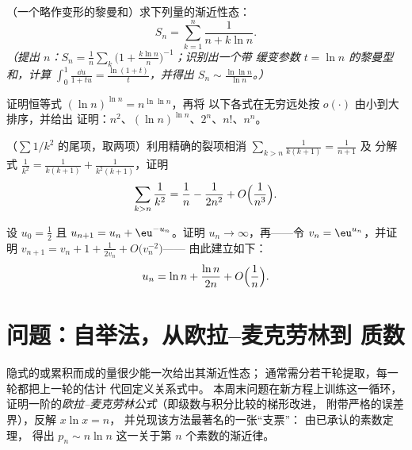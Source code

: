 \begin{exercise}[$\star\star\star$]\label{exo:b2:comparison:9}
（一个略作变形的黎曼和）求下列量的渐近性态：
\[
S_n = \sum_{k=1}^{n} \frac{1}{n + k\ln n} .
\]
\emph{（提出 $n$：$S_n = \frac1n\sum_k \bigl(1 +
\frac{k\ln n}{n}\bigr)^{-1}$；识别出一个带
缓变参数 $t = \ln n$ 的黎曼型和，计算 $\int_0^1
\frac{\dd u}{1 + tu} = \frac{\ln(1+t)}{t}$，并得出 $S_n \sim
\frac{\ln\ln n}{\ln n}$。）}
\end{exercise}

\begin{exercise}[$\star$]\label{exo:b2:comparison:10}
证明恒等式 $(\ln n)^{\ln n} = n^{\ln\ln n}$，再将
以下各式在无穷远处按 $o(\cdot)$ 由小到大排序，并给出
证明：$n^2$、$(\ln n)^{\ln n}$、$2^n$、$n!$、$n^n$。
\end{exercise}

\begin{exercise}[$\star\star$]\label{exo:b2:comparison:11}
（$\sum 1/k^2$ 的尾项，取两项）利用精确的裂项相消
$\sum_{k > n} \frac{1}{k(k+1)} = \frac{1}{n+1}$ 及
分解式 $\frac1{k^2} = \frac{1}{k(k+1)} +
\frac{1}{k^2(k+1)}$，证明
\[
\sum_{k > n} \frac{1}{k^2}
= \frac1n - \frac{1}{2n^2} + O\Bigl(\frac{1}{n^3}\Bigr).
\]
\end{exercise}

\begin{exercise}[$\star\star\star$]\label{exo:b2:comparison:12}
设 $u_0 = \frac12$ 且 $u_{n+1} = u_n + \eu^{-u_n}$。证明
$u_n \to \infty$，再——令 $v_n = \eu^{u_n}$，并证明
$v_{n+1} = v_n + 1 + \frac{1}{2v_n} + O\bigl(v_n^{-2}\bigr)$——
由此建立如下：
\[
u_n = \ln n + \frac{\ln n}{2n} + O\Bigl(\frac1n\Bigr).
\]
\end{exercise}

\section{问题：自举法，从欧拉–麦克劳林到
质数}

隐式的或累积而成的量很少能一次给出其渐近性态；
通常需分若干轮提取，每一轮都把上一轮的估计
代回定义关系式中。
本周末问题在新方程上训练这一循环，
证明一阶的\emph{欧拉–麦克劳林公式}（即级数与积分比较的梯形改进，
附带严格的误差界），反解 $x\ln x = n$，
并兑现该方法最著名的一张“支票”：
由已承认的素数定理，
得出 $p_n \sim n\ln n$ 这一关于第 $n$ 个素数的渐近律。


